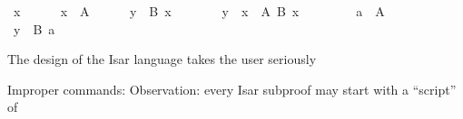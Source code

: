 \begin{isabellebody}
\ x\isanewline
\ \ \ \ \isamarkupfalse%
\ {\isachardoublequote}x\ {\isasymin}\ A{\isachardoublequote}\isanewline
\ \ \ \ \isamarkupfalse%
\ {\isachardoublequote}y\ {\isasymin}\ B\ x{\isachardoublequote}\ \isamarkupfalse%
\isanewline
\ \ \isamarkupfalse%
\isanewline
\isanewline
\ \ \isamarkupfalse%
\ {\isachardoublequote}y\ {\isasymin}\ {\isacharparenleft}{\isasymUnion}x\ {\isasymin}\ A{\isachardot}\ B\ x{\isacharparenright}{\isachardoublequote}\isanewline
\ \ \isamarkupfalse%
\isanewline
\ \ \ \ \isamarkupfalse%
\ {\isachardoublequote}a\ {\isasymin}\ A{\isachardoublequote}\ \isamarkupfalse%
\isanewline
\ \ \ \ \isamarkupfalse%
\ {\isachardoublequote}y\ {\isasymin}\ B\ a{\isachardoublequote}\ \isamarkupfalse%
\isanewline
\ \ \isamarkupfalse%
\isanewline
\isamarkupfalse%
\isamarkupfalse%
%
\isamarkuptrue%
%
\begin{isamarkuptext}%
The design of the Isar language takes the user seriously%
\end{isamarkuptext}%
\isamarkuptrue%
%
\isamarkuptrue%
%
\isamarkuptrue%
%
\isamarkuptrue%
%
\begin{isamarkuptext}%
Improper commands: 
  Observation: every Isar subproof may start with a ``script'' of%
\end{isamarkuptext}%
\isamarkuptrue%
\isamarkupfalse%
\end{isabellebody}%
